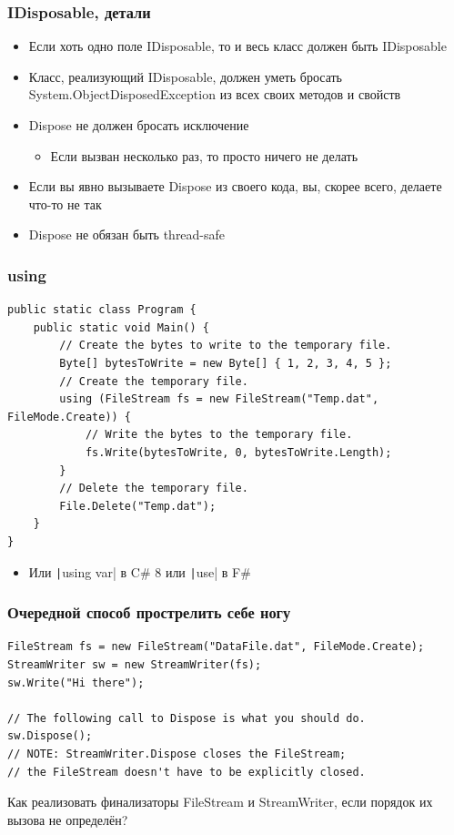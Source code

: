\documentclass[xetex,mathserif,serif]{beamer}
\begin{document}
    \begin{frame}
        \frametitle{IDisposable, детали}
        \begin{itemize}
            \item Если хоть одно поле IDisposable, то и весь класс должен быть IDisposable
            \item Класс, реализующий IDisposable, должен уметь бросать System.ObjectDisposedException из всех своих методов и свойств
            \item Dispose не должен бросать исключение
            \begin{itemize}
                \item Если вызван несколько раз, то просто ничего не делать
            \end{itemize}
            \item Если вы явно вызываете Dispose из своего кода, вы, скорее всего, делаете что-то не так
            \item Dispose не обязан быть thread-safe
        \end{itemize}
    \end{frame}

    \begin{frame}[fragile]
        \frametitle{using}
        \begin{scriptsize}
            \begin{verbatim}
public static class Program {
    public static void Main() {
        // Create the bytes to write to the temporary file.
        Byte[] bytesToWrite = new Byte[] { 1, 2, 3, 4, 5 };
        // Create the temporary file.
        using (FileStream fs = new FileStream("Temp.dat", FileMode.Create)) {
            // Write the bytes to the temporary file.
            fs.Write(bytesToWrite, 0, bytesToWrite.Length);
        }
        // Delete the temporary file.
        File.Delete("Temp.dat");
    }
}
            \end{verbatim}
        \end{scriptsize}
        \begin{itemize}
            \item Или \texttt|using var| в C\# 8 или \texttt|use| в F\#
        \end{itemize}
    \end{frame}

    \begin{frame}[fragile]
        \frametitle{Очередной способ прострелить себе ногу}
        \begin{verbatim}
FileStream fs = new FileStream("DataFile.dat", FileMode.Create);
StreamWriter sw = new StreamWriter(fs);
sw.Write("Hi there");

// The following call to Dispose is what you should do.
sw.Dispose();
// NOTE: StreamWriter.Dispose closes the FileStream;
// the FileStream doesn't have to be explicitly closed.
        \end{verbatim}
        Как реализовать финализаторы FileStream и StreamWriter, если порядок их вызова не определён?
    \end{frame}
\end{document}
